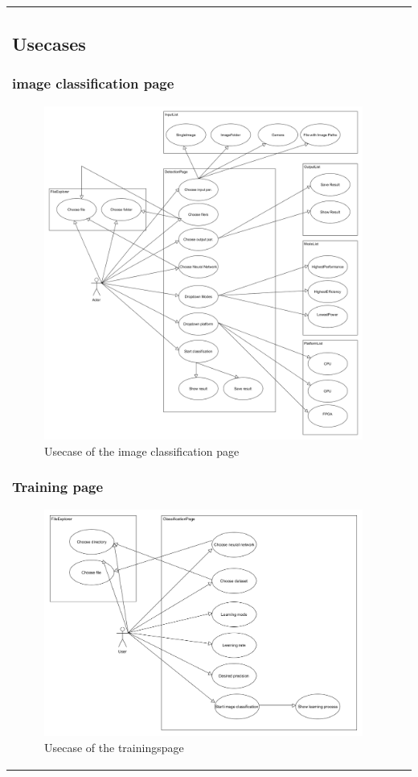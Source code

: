 \documentclass[parskip=full]{scrartcl}
\begin{document}
\begin{tabular}{p{2cm}p{12cm}}
\subsection{Usecases}
\subsubsection{\gls{image classification} page}
\begin{figure}[htb!]
\centering
\includegraphics[width=\textwidth]{ClassificationUsecase}
\caption{Usecase of the \gls{image classification} page}
\end{figure}
\newpage
\subsubsection{Training page}
\begin{figure}[htb!]
\centering
\includegraphics[width=\textwidth]{TrainUsecase}
\caption{Usecase of the trainingspage}
\end{figure}
\clearpage

\end{tabular}
\end{document}
